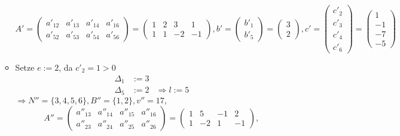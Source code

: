 \documentclass[a4paper,10pt]{article}
\begin{document}
\begin{enumerate}
\begin{itemize}
                \[
                 A' = \begin{pmatrix}
                        a'_{12} & a'_{13} & a'_{14} & a'_{16}\\
                        a'_{52} & a'_{53} & a'_{54} & a'_{56}
                     \end{pmatrix}
                   = \begin{pmatrix}
                        1 & 2 &  3 &  1 \\
                        1 & 1 & -2 & -1
                     \end{pmatrix}, 
                 b' = \begin{pmatrix}b'_1 \\ b'_5 \end{pmatrix} 
                   = \begin{pmatrix}3 \\ 2\end{pmatrix},
                 c' = \begin{pmatrix}c'_2 \\ c'_3 \\ c'_4 \\ c'_6\end{pmatrix} 
                   = \begin{pmatrix}1 \\ -1 \\ -7 \\ -5 \end{pmatrix}
                \]
        \item   Setze $e := 2$, da $c'_2 = 1 > 0$
                \begin{align*}
                    \Delta_1 &:= 3\\
                    \Delta_5 &:= 2 & \Rightarrow l := 5
                \end{align*}
                $\Rightarrow N'' = \{3,4,5,6\}, B'' = \{1,2\}, v'' = 17,$
                \[
                 A'' = \begin{pmatrix}
                        a''_{13} & a''_{14} & a''_{15} & a''_{16}\\
                        a''_{23} & a''_{24} & a''_{25} & a''_{26}
                     \end{pmatrix}
                   = \begin{pmatrix}
                        1 &  5 & -1 &  2 \\
                        1 & -2 &  1 & -1
                     \end{pmatrix}, 
\]
\end{itemize}
\end{enumerate}
\end{document}
